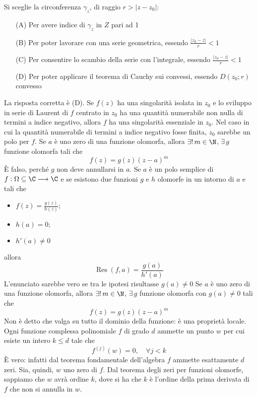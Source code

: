     Si sceglie la circonferenza $\gamma_z$, di raggio $r > |z - z_0|$: \begin{enumerate}
        \item[(A)] Per avere indice di $\gamma_z$ in $Z$ pari ad 1
        \item[(B)] Per poter lavorare con una serie geometrica, essendo $ \frac{|z_0 - z|}{r} < 1$
        \item[(C)] Per consentire lo scambio della serie con l'integrale, essendo $ \frac{|z_0 - z|}{r} < 1$
        \item[(D)] Per poter applicare il teorema di Cauchy sui convessi, essendo $D(z_0 ; r)$ convesso
    \end{enumerate}
    La risposta corretta è (D).
Se $f(z)$ ha una singolarità isolata in $z_0$ e lo sviluppo in serie di Laurent di $f$ centrato in $z_0$ ha una quantità numerabile non nulla di termini a indice negativo, allora $f$ ha una singolarità essenziale in $z_0$.
    Nel caso in cui la quantità numerabile di termini a indice negativo fosse finita, $z_0$ sarebbe un polo per $f$.
    Se $a$ è uno zero di una funzione olomorfa, allora $\exists!\, m \in \N$, $ \exists\, g$ funzione olomorfa tali che \[
        f(z) = g(z)(z-a)^m
    \]
    È falso, perché $ g $ non deve annullarsi in $ a $.
    Se $ a $ è un polo semplice di $ f: \Omega \subseteq \C \longrightarrow \C $ e se esistono due funzioni $ g $ e $ h $ olomorfe in un intorno di $ a $ e tali che \begin{itemize}
        \item $ \displaystyle f(z)=\frac{g(z)}{h(z)} $; 
        \item $ h(a)= 0 $; 
        \item $ h'(a)\neq 0 $
    \end{itemize}allora \[
        \operatorname{Res}(f,a) = \frac{g(a)}{h'(a)}
    \]
    L'enunciato sarebbe vero se tra le ipotesi risultasse $ g(a)\neq 0 $
    Se $a$ è uno zero di una funzione olomorfa, allora $\exists!\, m \in \N$, $ \exists\, g$ funzione olomorfa con $ g(a)\neq 0 $ tali che \[
        f(z) = g(z)(z-a)^m
    \]
    Non è detto che valga su tutto il dominio della funzione: è una proprietà locale. 
    Ogni funzione complessa polinomiale $f$ di grado $d$ ammette un punto $w$ per cui esiste un intero $k \le  d$ tale che \[
        f^{(j)}(w) = 0, \quad \forall j < k
    \]
    È vero: infatti dal teorema fondamentale dell'algebra $f$ ammette esattamente $d$ zeri. Sia, quindi, $w$ uno zero di $f$. Dal teorema degli zeri per funzioni olomorfe, sappiamo che $w$ avrà ordine $k$, dove si ha che $k$ è l'ordine della prima derivata di $f$ che non si annulla in $w$.

